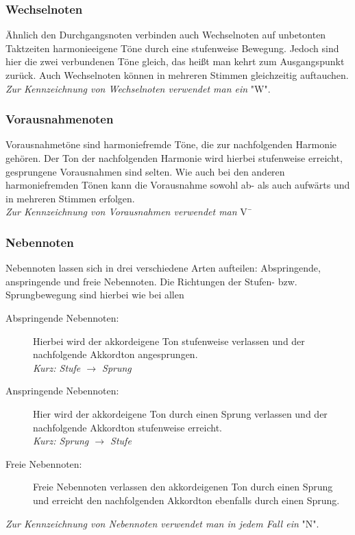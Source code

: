 \documentclass[a4paper]{article}
\begin{document}
	\subsubsection{Wechselnoten}
	Ähnlich den Durchgangsnoten verbinden auch Wechselnoten auf unbetonten Taktzeiten harmonieeigene Töne durch eine stufenweise Bewegung. Jedoch sind hier die zwei verbundenen Töne gleich, das heißt man kehrt zum Ausgangspunkt zurück. Auch Wechselnoten können in mehreren Stimmen gleichzeitig auftauchen.\\
	\textit{Zur Kennzeichnung von Wechselnoten verwendet man ein} "W".
	
	\subsubsection{Vorausnahmenoten}
	Vorausnahmetöne sind harmoniefremde Töne, die zur nachfolgenden Harmonie gehören. Der Ton der nachfolgenden Harmonie wird hierbei stufenweise erreicht, gesprungene Vorausnahmen sind selten. Wie auch bei den anderen harmoniefremden Tönen kann die Vorausnahme sowohl ab- als auch aufwärts und in mehreren Stimmen erfolgen.\\
	\textit{Zur Kennzeichnung von Vorausnahmen verwendet man} V¯ %
	
	\subsubsection{Nebennoten}
	Nebennoten lassen sich in drei verschiedene Arten aufteilen: Abspringende, anspringende und freie Nebennoten. Die Richtungen der Stufen- bzw. Sprungbewegung sind hierbei wie bei allen \\
	\begin{description}
		\item[Abspringende Nebennoten:] Hierbei wird der akkordeigene Ton stufenweise verlassen und der nachfolgende Akkordton angesprungen.\\
		\textit{Kurz: Stufe $\rightarrow$ Sprung}
		\item[Anspringende Nebennoten:] Hier wird der akkordeigene Ton durch einen Sprung verlassen und der nachfolgende Akkordton stufenweise erreicht.\\
		\textit{Kurz: Sprung $\rightarrow$ Stufe}
		\item[Freie Nebennoten:] Freie Nebennoten verlassen den akkordeigenen Ton durch einen Sprung und erreicht den nachfolgenden Akkordton ebenfalls durch einen Sprung.
	\end{description}
	\textit{Zur Kennzeichnung von Nebennoten verwendet man in jedem Fall ein} "N".
	
\end{document}

